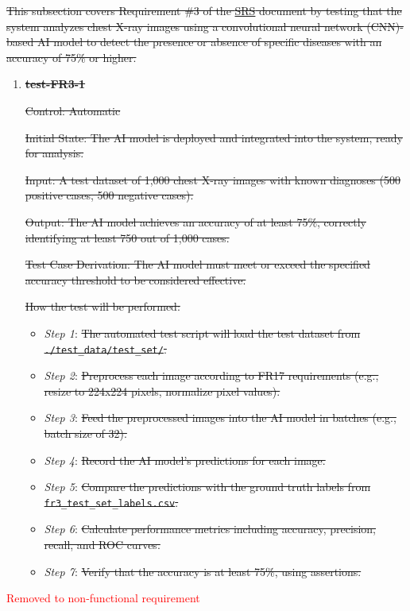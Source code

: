 \documentclass[12pt, titlepage]{article}
\begin{document}
\sout{This subsection covers Requirement \#3 of the \href{https://github.com/RezaJodeiri/CXR-Capstone/blob/main/docs/SRS/SRS.pdf}{SRS}
document by testing that the system analyzes chest X-ray images using a convolutional neural network (CNN)-based AI model to detect the presence or absence of specific diseases with an accuracy of 75\% or higher.}\citep{SRS}

\begin{enumerate}

\item \textbf{\sout{test-FR3-1}} \label{test-FR3-1}

\sout{Control: Automatic}

\sout{Initial State: The AI model is deployed and integrated into the system, ready for analysis.}

\sout{Input: A test dataset of 1,000 chest X-ray images with known diagnoses (500 positive cases, 500 negative cases).}

\sout{Output: The AI model achieves an accuracy of at least 75\%, correctly identifying at least 750 out of 1,000 cases.}

\sout{Test Case Derivation: The AI model must meet or exceed the specified accuracy threshold to be considered effective.}

\sout{How the test will be performed:}
\begin{itemize}
  \item[-] \textit{Step 1}: \sout{The automated test script will load the test dataset from \texttt{./test\_data/test\_set/}.}
  \item[-] \textit{Step 2}: \sout{Preprocess each image according to FR17 requirements (e.g., resize to 224x224 pixels, normalize pixel values).}
  \item[-] \textit{Step 3}: \sout{Feed the preprocessed images into the AI model in batches (e.g., batch size of 32).}
  \item[-] \textit{Step 4}: \sout{Record the AI model's predictions for each image.}
  \item[-] \textit{Step 5}: \sout{Compare the predictions with the ground truth labels from \texttt{fr3\_test\_set\_labels.csv}.}
  \item[-] \textit{Step 6}: \sout{Calculate performance metrics including accuracy, precision, recall, and ROC curves.}
  \item[-] \textit{Step 7}: \sout{Verify that the accuracy is at least 75\%, using assertions.}
\end{itemize}

\end{enumerate}
\textcolor{red}{Removed to non-functional requirement}
\end{document}
